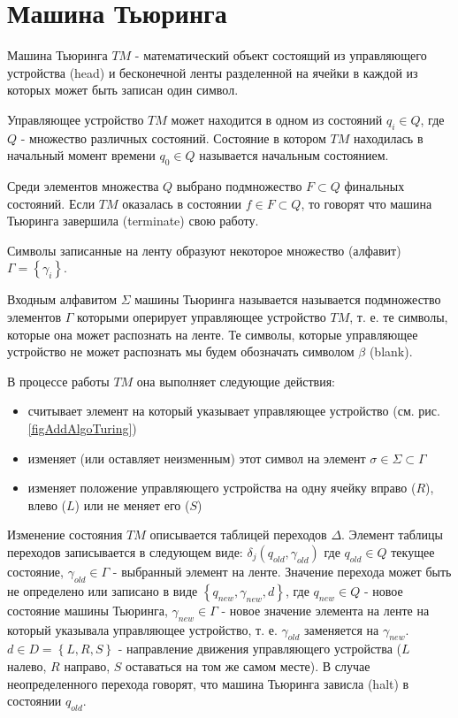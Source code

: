 \section{Машина Тьюринга}
\label{addTuring}

Машина Тьюринга $TM$ - математический объект состоящий из
управляющего устройства (head) и бесконечной ленты разделенной на
ячейки в каждой из которых может быть записан один символ.



Управляющее устройство $TM$ может находится в одном из состояний $q_i
\in Q$, где $Q$ 
- множество различных состояний. Состояние в котором $TM$ находилась в
начальный момент времени $q_0 \in Q$ называется начальным состоянием. 

Среди элементов множества $Q$ выбрано подмножество $F \subset Q$
финальных состояний. Если $TM$ оказалась в состоянии $f \in F \subset
Q$, то говорят что машина Тьюринга завершила (terminate) свою работу.

Символы записанные на ленту образуют некоторое множество (алфавит)
$\Gamma = \left\{\gamma_i\right\}$.

Входным алфавитом $\Sigma$ машины Тьюринга называется называется
подмножество элементов $\Gamma$ которыми оперирует управляющее устройство $TM$,
т. е. те символы, которые она может распознать на ленте. Те символы,
которые управляющее устройство не может распознать мы будем обозначать символом
$\beta$ (blank).

В процессе работы $TM$ она выполняет следующие действия:
\begin{itemize}
\item{считывает элемент на который указывает управляющее устройство
  (см. рис. \ref{figAddAlgoTuring})}
\item{изменяет (или оставляет неизменным) этот символ на элемент
  $\sigma \in \Sigma \subset \Gamma$}
\item{изменяет положение управляющего устройства на одну ячейку вправо
  ($R$), влево ($L$) или не меняет его ($S$)}
\end{itemize}

Изменение состояния $TM$ описывается таблицей переходов
$\Delta$. Элемент таблицы переходов записывается в следующем виде: 
$\delta_j\left(q_{old}, \gamma_{old}\right)$ где $q_{old} \in Q$ текущее состояние,
$\gamma_{old} \in \Gamma$ - выбранный элемент на ленте. Значение
перехода может быть 
не определено или записано в виде $\left\{q_{new}, \gamma_{new}, d\right\}$, где
$q_{new} \in Q$ - новое состояние машины Тьюринга, $\gamma_{new} \in \Gamma$ -
новое значение элемента на ленте на который указывала управляющее устройство,
т. е. $\gamma_{old}$ заменяется на $\gamma_{new}$. $d \in D =
\left\{L, R, S\right\}$ - направление
движения управляющего устройства ($L$ налево, $R$ направо, $S$
оставаться на том же самом месте). В случае неопределенного
перехода говорят, что машина Тьюринга зависла (halt) в состоянии $q_{old}$.



